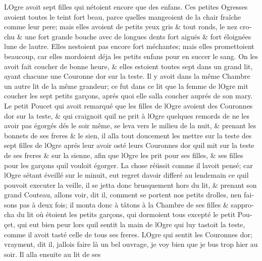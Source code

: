 \documentclass[14pt,a4paper]{memoir}
\begin{document}
{{\begin{otherlanguage}{french}
L\textquotesingle Ogre avoit sept filles qui n\textquotesingle étoient
encore que des enfans. Ces petites Ogresses avoient toutes le teint fort
beau, parce qu\textquotesingle elles mangeoient de la chair fraîche
comme leur pere; mais elles avoient de petits yeux gris \& tout ronds,
le nez crochu \& une fort grande bouche avec de longues dents fort
aiguës \& fort éloignées l\textquotesingle une de
l\textquotesingle autre. Elles n\textquotesingle estoient pas encore
fort méchantes; mais elles promettoient beaucoup, car elles mordoient
déja les petits enfans pour en succer le sang. On les avoit fait coucher
de bonne heure, \& elles estoient toutes sept dans un grand lit, ayant
chacune une Couronne d\textquotesingle or sur la teste. Il y avoit dans
la même Chambre un autre lit de la même grandeur; ce fut dans ce lit que
la femme de l\textquotesingle Ogre mit coucher les sept petits garçons,
aprés quoi elle s\textquotesingle alla coucher auprés de son mary. Le
petit Poucet qui avoit remarqué que les filles de l\textquotesingle Ogre
avoient des Couronnes d\textquotesingle or sur la teste, \& qui
craignoit qu\textquotesingle il ne prit à l\textquotesingle Ogre
quelques remords de ne les avoir pas égorgés dés le soir même, se leva
vers le milieu de la nuit, \& prenant les bonnets de ses freres \& le
sien, il alla tout doucement les mettre sur la teste des sept filles de
l\textquotesingle Ogre aprés leur avoir osté leurs Couronnes
d\textquotesingle or qu\textquotesingle il mit sur la teste de ses
freres \& sur la sienne, afin que l\textquotesingle Ogre les prit pour
ses filles, \& ses filles pour les garçons qu\textquotesingle il vouloit
égorger. La chose réüssit comme il l\textquotesingle avoit pensé; car
l\textquotesingle Ogre s\textquotesingle étant éveillé sur le minuit,
eut regret d\textquotesingle avoir differé au lendemain ce
qu\textquotesingle il pouvoit executer la veille, il se jetta donc
brusquement hors du lit, \& prenant son grand Couteau, allons voir, dit
il, comment se portent nos petits drolles, n\textquotesingle en faisons
pas à deux fois; il monta donc à tâtons à la Chambre de ses filles \&
s\textquotesingle approcha du lit où étoient les petits garçons, qui
dormoient tous excepté le petit Pouçet, qui eut bien peur lors
qu\textquotesingle il sentit la main de l\textquotesingle Ogre qui luy
tastoit la teste, comme il avoit tasté celle de tous ses freres.
L\textquotesingle Ogre qui sentit les Couronnes d\textquotesingle or;
vrayment, dit il, j\textquotesingle allois faire là un bel ouvrage, je
voy bien que je bus trop hier au soir. Il alla ensuite au lit de ses

\end{otherlanguage}}}
\end{document}
